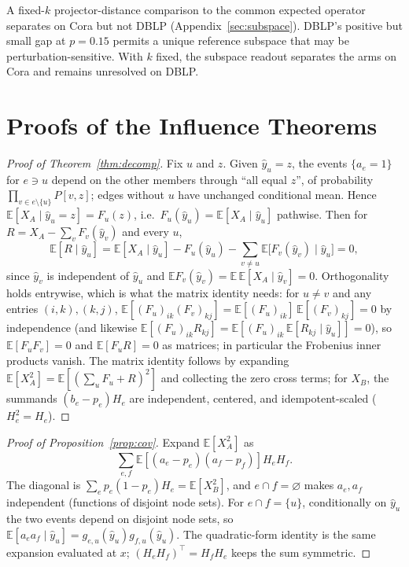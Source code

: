 \documentclass[preprint,11pt]{elsarticle}
\let\paragraph\elsparagraph
\begin{document}
\paragraph{Secondary spectral readout.}
A fixed-$k$ projector-distance comparison to the common expected
operator separates on Cora but not DBLP
(Appendix~\ref{sec:subspace}). DBLP's positive but small gap at
$p=0.15$ permits a unique reference subspace that may be
perturbation-sensitive. With $k$ fixed, the subspace readout separates
the arms on Cora and remains unresolved on DBLP.


\clearpage
\section{Proofs of the Influence Theorems}\label{app:proofs-influence}

\begin{proof}[Proof of Theorem~\ref{thm:decomp}]
Fix $u$ and $z$. Given $\hat y_u=z$, the events
$\{a_e=1\}$ for $e\ni u$ depend on the other members through
``all equal $z$'', of probability $\prod_{v\in e\setminus\{u\}}P[v,z]$;
edges without $u$ have unchanged conditional mean. Hence
$\mathbb E[X_A\mid\hat y_u=z]=F_u(z)$, i.e.\ $F_u(\hat y_u)
=\mathbb E[X_A\mid\hat y_u]$ pathwise. Then for $R=X_A-\sum_vF_v(\hat y_v)$
and every $u$,
\[
\mathbb E[R\mid\hat y_u]
=\mathbb E[X_A\mid\hat y_u]-F_u(\hat y_u)
-\sum_{v\ne u}\mathbb E\bigl[F_v(\hat y_v)\mid\hat y_u\bigr]=0,
\]
since $\hat y_v$ is independent of $\hat y_u$ and
$\mathbb EF_v(\hat y_v)=\mathbb E\,\mathbb E[X_A\mid\hat y_v]=0$.
Orthogonality holds entrywise, which is what the matrix identity
needs: for $u\ne v$ and any entries $(i,k),(k,j)$,
$\mathbb E[(F_u)_{ik}(F_v)_{kj}]
=\mathbb E[(F_u)_{ik}]\,\mathbb E[(F_v)_{kj}]=0$ by independence
(and likewise $\mathbb E[(F_u)_{ik}R_{kj}]
=\mathbb E[(F_u)_{ik}\,\mathbb E[R_{kj}\mid\hat y_u]]=0$), so
$\mathbb E[F_uF_v]=0$ and $\mathbb E[F_uR]=0$ as matrices; in
particular the Frobenius inner products vanish.
The matrix identity follows by expanding
$\mathbb E[X_A^2]=\mathbb E[(\sum_uF_u+R)^2]$ and collecting the
zero cross terms; for $X_B$, the summands $(b_e-p_e)H_e$ are
independent, centered, and idempotent-scaled ($H_e^2=H_e$).
\end{proof}

\begin{proof}[Proof of Proposition~\ref{prop:cov}]
Expand $\mathbb E[X_A^2]$ as
\[
\sum_{e,f}\mathbb E[(a_e-p_e)(a_f-p_f)]H_eH_f.
\]
The diagonal is $\sum_ep_e(1-p_e)H_e=\mathbb E[X_B^2]$, and
$e\cap f=\varnothing$ makes $a_e,a_f$ independent (functions of
disjoint node sets). For $e\cap f=\{u\}$, conditionally on $\hat y_u$
the two events depend on disjoint node sets, so
$\mathbb E[a_ea_f\mid\hat y_u]=g_{e,u}(\hat y_u)g_{f,u}(\hat y_u)$.
The quadratic-form identity is the same expansion evaluated at $x$;
$(H_eH_f)^\top=H_fH_e$ keeps the sum symmetric.
\end{proof}
\end{document}
